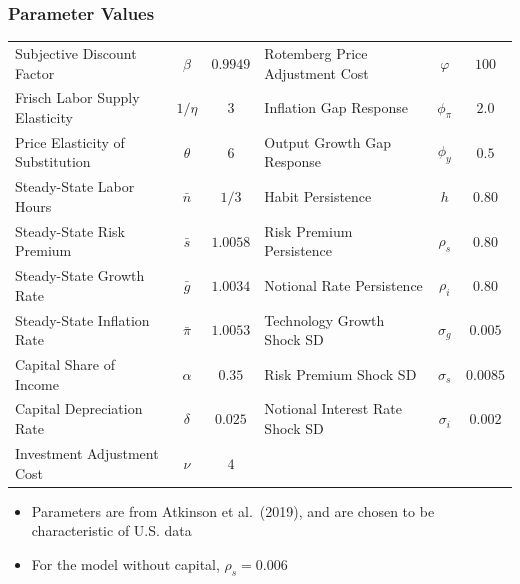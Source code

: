 \documentclass[11pt]{beamer}
\begin{document}
\begin{frame}\frametitle{Parameter Values}
\begin{table}[H]
\centering
\captionsetup{justification=centering}
  \scriptsize
    \setlength{\tabcolsep}{3pt}      
  \begin{tabular}{l c c |l  c c}
    \hline
  Subjective Discount Factor & $\beta$ & $0.9949$ & Rotemberg Price Adjustment Cost & $\varphi$ & $100$ \\
   Frisch Labor Supply Elasticity & $1/\eta$ & $3$ & Inflation Gap Response & $\phi_\pi$ & $2.0$ \\
  Price Elasticity of Substitution & $\theta$ & $6$ & Output Growth Gap Response & $\phi_y$ & $0.5$ \\
  Steady-State Labor Hours & $\bar{n}$ & $1/3$ & Habit Persistence & $h$ & $0.80$ \\
  Steady-State Risk Premium & $\bar{s}$ & $1.0058$ & Risk Premium Persistence & $\rho_s$ & $0.80$ \\
  Steady-State Growth Rate & $\bar{g}$ & $1.0034$ & Notional Rate Persistence & $\rho_i$ & $0.80$ \\
  Steady-State Inflation Rate & $\bar{\pi}$ & $1.0053$ & Technology Growth Shock SD & $\sigma_g$ & $0.005$ \\
  Capital Share of Income & $\alpha$ & $0.35$ & Risk Premium Shock SD & $\sigma_s$ & $0.0085$ \\
  Capital Depreciation Rate & $\delta$ & $0.025$ & Notional Interest Rate Shock SD & $\sigma_i$ & $0.002$ \\
  Investment Adjustment Cost & $\nu$ & $4$ & & &\\
  \hline
  \end{tabular}
\normalfont
\end{table}
\begin{itemize}\setlength{\itemsep}{8pt}
\item Parameters are from Atkinson et al.\ (2019), and are chosen to be characteristic of U.S. data
\item For the model without capital, $\rho_s = 0.006$ %
\end{itemize}
\end{frame}
\end{document}
